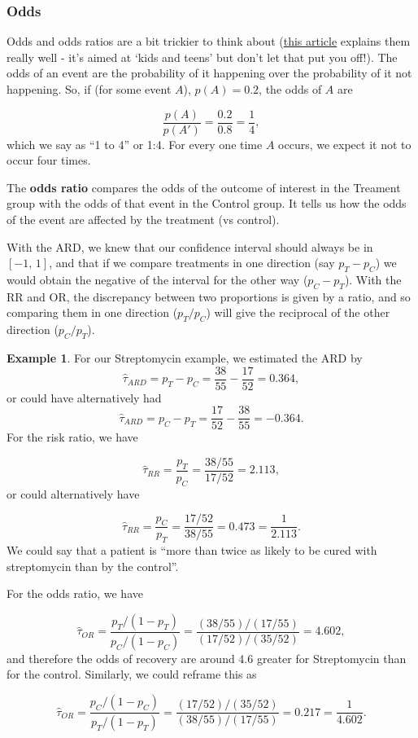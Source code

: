 \documentclass[
  openany]{book}
\theoremstyle{definition}
\theoremstyle{definition}
\newtheorem{example}{Example}[chapter]
\theoremstyle{definition}
\theoremstyle{definition}
\theoremstyle{remark}
\begin{document}
\hypertarget{odds}{%
\subsubsection*{Odds}\label{odds}}

Odds and odds ratios are a bit trickier to think about (\href{https://kids.frontiersin.org/articles/10.3389/frym.2022.926624\#:~:text=As\%20an\%20example\%2C\%20if\%20the,disease\%20if\%20you\%20are\%20exposed.}{this article} explains them really well - it's aimed at `kids and teens' but don't let that put you off!). The odds of an event are the probability of it happening over the probability of it not happening. So, if (for some event \(A\)), \(p\left(A\right)=0.2\), the odds of \(A\) are

\[\frac{p\left(A\right)}{p\left(A'\right)} = \frac{0.2}{0.8} = \frac{1}{4}, \]
which we say as ``1 to 4'' or 1:4. For every one time \(A\) occurs, we expect it not to occur four times.

The \textbf{odds ratio} compares the odds of the outcome of interest in the Treament group with the odds of that event in the Control group. It tells us how the odds of the event are affected by the treatment (vs control).

With the ARD, we knew that our confidence interval should always be in \(\left[-1,\,1\right]\), and that if we compare treatments in one direction (say \(p_T - p_C\)) we would obtain the negative of the interval for the other way (\(p_C - p_T\)). With the RR and OR, the discrepancy between two proportions is given by a ratio, and so comparing them in one direction (\(p_T / p_C\)) will give the reciprocal of the other direction (\(p_C / p_T\)).

\begin{example}
For our Streptomycin example, we estimated the ARD by
\[\hat\tau_{ARD}=p_T - p_C = \frac{38}{55} - \frac{17}{52} = 0.364,\]
or could have alternatively had
\[\hat\tau_{ARD}=p_C - p_T = \frac{17}{52} - \frac{38}{55} = - 0.364.\]
For the risk ratio, we have

\[\hat{\tau}_{RR} = \frac{p_T}{p_C} = \frac{38/55}{17/52} = 2.113,\]
or could alternatively have

\[\hat{\tau}_{RR} = \frac{p_C}{p_T} = \frac{17/52}{38/55} = 0.473 = \frac{1}{2.113}.\]
We could say that a patient is ``more than twice as likely to be cured with streptomycin than by the control''.

For the odds ratio, we have

\[\hat{\tau}_{OR} = \frac{p_T/\left(1-p_T\right)}{p_C/\left(1-p_C\right)} = \frac{(38/55)/(17/55)}{(17/52)/(35/52)} = 4.602, \]
and therefore the odds of recovery are around 4.6 greater for Streptomycin than for the control. Similarly, we could reframe this as

\[\hat{\tau}_{OR} = \frac{p_C/\left(1-p_C\right)}{p_T/\left(1-p_T\right)} = \frac{(17/52)/(35/52)}{(38/55)/(17/55)} = 0.217 = \frac{1}{4.602}.\]
\end{example}
\end{document}
